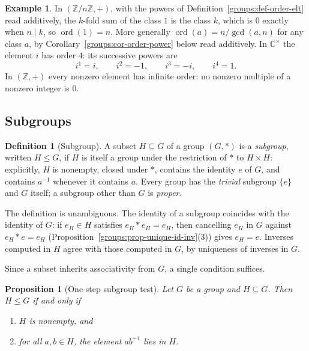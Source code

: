 \documentclass[11pt,a4paper]{article}
\newtheorem{proposition}[theorem]{Proposition}
\theoremstyle{definition}
\newtheorem{definition}[theorem]{Definition}
\newtheorem{example}[theorem]{Example}
\theoremstyle{remark}
\newcommand{\Z}{\ensuremath{\mathbb{Z}}}
\providecommand{\C}{}\renewcommand{\C}{\ensuremath{\mathbb{C}}}
\DeclareMathOperator{\ord}{ord}
\begin{document}
\begin{example}\label{groups:exa-orders}
In \((\Z/n\Z, +)\), with the powers of
Definition~\ref{groups:def-order-elt} read additively, the \(k\)-fold sum of
the class \(1\) is the class \(k\), which is \(0\) exactly when
\(n \mid k\), so \(\ord(1) = n\). More generally
\(\ord(a) = n/\gcd(a,n)\) for any class \(a\), by
Corollary~\ref{groups:cor-order-power} below read additively. In
\(\C^\times\) the element \(i\) has order \(4\): its successive powers are
\[
i^1 = i, \qquad i^2 = -1, \qquad i^3 = -i, \qquad i^4 = 1 .
\]
In \((\Z,+)\) every nonzero element has infinite order: no nonzero
multiple of a nonzero integer is \(0\).
\end{example}

\subsection{Subgroups}\label{groups:sub:subgroups}

\begin{definition}[Subgroup]\label{groups:def-subgroup}
A subset \(H \subseteq G\) of a group \((G,\ast)\) is a \emph{subgroup},
written \(H \le G\), if \(H\) is itself a group under the restriction of
\(\ast\) to \(H \times H\): explicitly, \(H\) is nonempty, closed under
\(\ast\), contains the identity \(e\) of \(G\), and contains \(a^{-1}\)
whenever it contains \(a\). Every group has the \emph{trivial} subgroup
\(\{e\}\) and \(G\) itself; a subgroup other than \(G\) is \emph{proper}.
\end{definition}

The definition is unambiguous. The identity of a subgroup coincides with
the identity of \(G\): if \(e_H \in H\) satisfies \(e_H \ast e_H = e_H\),
then cancelling \(e_H\) in \(G\) against \(e_H \ast e = e_H\)
(Proposition~\ref{groups:prop-unique-id-inv}(3)) gives \(e_H = e\).
Inverses computed in \(H\) agree with those computed in \(G\), by
uniqueness of inverses in \(G\).

Since a subset inherits associativity from \(G\), a single condition
suffices.

\begin{proposition}[One-step subgroup test]\label{groups:prop-subgroup-test}
Let \(G\) be a group and \(H \subseteq G\). Then \(H \le G\) if and only
if
\begin{enumerate}
\item \(H\) is nonempty, and
\item for all \(a, b \in H\), the element \(a b^{-1}\) lies in \(H\).
\end{enumerate}
\end{proposition}
\end{document}
